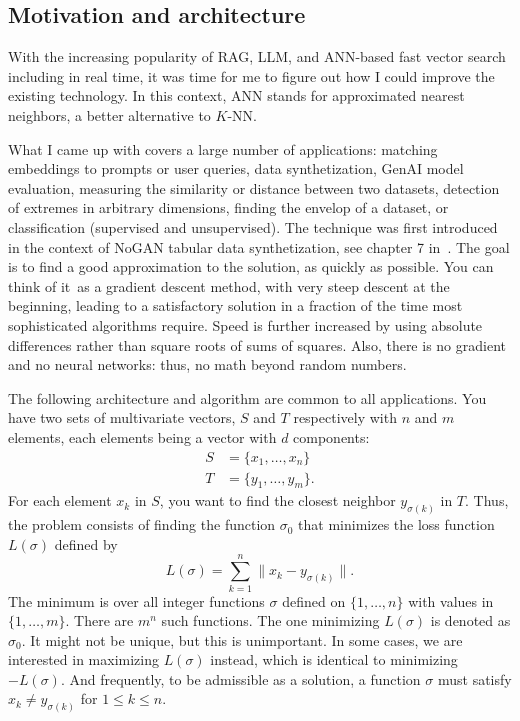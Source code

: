 \documentclass[oneside,10pt]{book}
\begin{document}
\subsection{Motivation and architecture}

With the increasing popularity of RAG, LLM, and ANN-based fast vector search including in real time, it was time for me 
to figure out how I could improve the existing technology. In this context, ANN stands for 
\textcolor{index}{approximated nearest neighbors},
 a better alternative to $K$-NN.

What I came up with covers a large number of applications: matching embeddings to prompts or user queries, data synthetization, GenAI model evaluation, measuring the similarity or distance between two datasets, detection of extremes in arbitrary 
 dimensions,  finding the envelop of a dataset, or classification (supervised and unsupervised).  The technique
 was first introduced in the context of NoGAN tabular data synthetization, 
see chapter 7 in~\cite{vgmloptim}. The goal is to find a good approximation to the solution, as quickly as possible. You can think of it~as a gradient descent method, with very steep descent at the beginning, leading to a satisfactory solution in a fraction of the time 
 most sophisticated algorithms require. Speed is further increased by using absolute differences rather than square roots of sums of squares. Also, there is no gradient and no neural networks: thus, no math beyond
 random numbers. 

The following architecture and algorithm are common to all applications. You have two sets of multivariate vectors,
 $S$ and $T$ respectively with $n$ and $m$ elements, each elements being a vector with $d$ components:
\begin{align}
S & =\{x_1,\dots, x_n\} \nonumber\\
T & = \{y_1,\dots, y_m\} \nonumber.
\end{align}
For each element $x_k$ in $S$, you want to find the closest neighbor $y_{\sigma(k)}$ in $T$. 
 Thus, the problem consists of finding 
the function $\sigma_0$ that minimizes the \textcolor{index}{loss function}
 $L(\sigma)$ defined by
\begin{equation}
 L(\sigma) = \sum_{k=1}^n \|x_k - y_{\sigma(k)}\|. \label{lossder}
\end{equation}
The minimum is over all integer functions $\sigma$ defined on $\{1, \dots, n\}$ with
 values in $\{1, \dots, m\}$. There are $m^n$ such functions. The one minimizing $L(\sigma)$ is
 denoted as $\sigma_0$. It might not be unique, but this is unimportant. 
In some cases, we are interested in maximizing $L(\sigma)$ instead, which is identical to
minimizing $-L(\sigma)$. 
And frequently, to be admissible as a solution,
 a function $\sigma$ must satisfy $x_k \neq y_{\sigma(k)}$ for $1\leq k\leq n$. 
\end{document}
